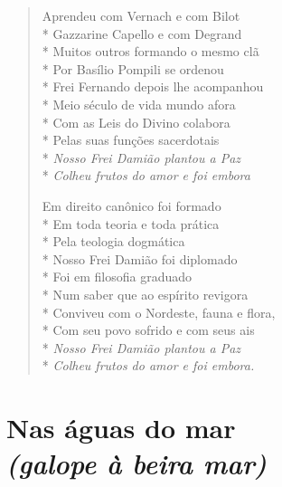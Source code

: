 \begin{verse}
Aprendeu com Vernach e com Bilot\\*
Gazzarine Capello e com Degrand\\*
Muitos outros formando o mesmo clã\\*
Por Basílio Pompili se ordenou\\*
Frei Fernando depois lhe acompanhou\\*
Meio século de vida mundo afora\\*
Com as Leis do Divino colabora\\*
Pelas suas funções sacerdotais\\*
\textit{Nosso Frei Damião plantou a Paz}\\*
\textit{Colheu frutos do amor e foi embora}

Em direito canônico foi formado\\*
Em toda teoria e toda prática\\*
Pela teologia dogmática\\*
Nosso Frei Damião foi diplomado\\*
Foi em filosofia graduado\\*
Num saber que ao espírito revigora\\*
Conviveu com o Nordeste, fauna e flora,\\*
Com seu povo sofrido e com seus ais\\*
\textit{Nosso Frei Damião plantou a Paz}\\*
\textit{Colheu frutos do amor e foi embora.}
\end{verse}


\chapter[Nas águas do mar]{Nas águas do mar\\\smallskip\textit{(galope à beira mar)}}

